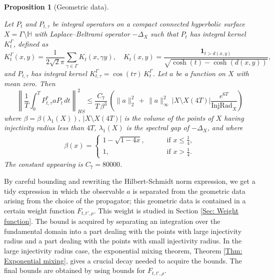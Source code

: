 \documentclass[11pt,twoside,reqno]{amsart} \usepackage{a4wide} \usepackage[T1]{fontenc} \usepackage[utf8]{inputenc} \usepackage{soul}  \usepackage{amsmath} \usepackage{amsfonts} \usepackage{amssymb} \usepackage{mathtools} \usepackage{amsthm} \usepackage{xcolor} \usepackage{graphicx} \usepackage{hyperref} \usepackage{standalone} \usepackage{esint} \usepackage{comment} \usepackage[left=2.3cm,top=3cm,right=2.3cm]{geometry} \usepackage{bm} \usepackage{svg} \usepackage{float} \numberwithin{equation}{section} \theoremstyle{plain} \newtheorem{thm}{Theorem}[section] \newtheorem{theorem}[thm]{Theorem} \newtheorem*{theorem*}{Theorem}\newtheorem{conj}[thm]{Conjecture} \newtheorem{lemma}[thm]{Lemma} \newtheorem{prop}[thm]{Proposition} \newtheorem{proposition}[thm]{Proposition} \newtheorem{cor}[thm]{Corollary} \newtheorem{question}[thm]{Question} \newtheorem{corollary}[thm]{Corollary} \newtheorem{assumption}[thm]{Assumption} \theoremstyle{definition} \newtheorem{defn}[thm]{Definition} \newtheorem{choice}[thm]{Choice} \newtheorem{definition}[thm]{Definition} \newtheorem{ex}[thm]{Example} \newtheorem{notation}[thm]{Notation} \newtheorem*{ack}{Acknowledgements} \theoremstyle{remark} \newtheorem{remark}[thm]{Remark} \newtheorem{bigremark}[thm]{Remark} \usepackage{xcolor} \newcommand{\red}[1]{ {\color{Red}#1} } \newcommand{\blue}[1]{ {\color{Blue}#1} } \author{Kai Hippi} \address{Aalto University, Espoo, Finland} \email{kai.hippi@aalto.fi}
\begin{document}
\begin{proposition}[Geometric data]
\label{Prp: Geometric data}

Let $P_t$ and $P_{t,\tau}$ be integral operators on a compact connected hyperbolic surface $X = \Gamma \setminus \mathbb{H}$ with Laplace--Beltrami operator $ -\Delta_{X} $ such that $ P_{t} $ has integral kernel $ K_{t}^{\Gamma} $, defined as
\[
K_t^\Gamma(x,y) = \frac{1}{2 \sqrt{2} \pi} \sum_{\gamma \in \Gamma} K_t(x, \gamma y), \quad
K_t(x,y) = \frac{\mathbf{1}_{t > d(x,y)}}{\sqrt{\cosh(t) - \cosh(d(x,y))}},
\]
and $ P_{t,\tau} $ has integral kernel $K_{t,\tau}^{\Gamma} = \cos(t \tau) \, K_t^\Gamma$. Let $ a $ be a function on $ X $ with mean zero. Then
\[
	\left\| \frac{1}{T} \int_0^T P_{t,\tau}^{*} a P_t \, dt \right\|_{HS}^{2} \leq \frac{C_{7}}{T \, \beta^{3}} \, \left( \| a \|_{2}^{2} \, + \,  \| a \|_{\infty}^{2} \, | X \setminus X( 4T ) | \frac{e^{6 T}}{ \operatorname{InjRad}_{X} } \right)
\]
where $ \beta = \beta( \lambda_{1}( X ) ) $,  $|X \setminus X( 4T )|$  is the volume of the points of $ X $ having injectivity radius less than $ 4T $, $ \lambda_{1}( X ) $ is the spectral gap of $ -\Delta_{X} $, and where
\begin{align*}
	\beta( x ) = 
	\begin{cases}	
		1 - \sqrt{ 1 - 4x }, \qquad & \text{ if } x \leq \frac{1}{4},
		\\
		1, \qquad & \text{ if } x > \frac{1}{4}.
	\end{cases}
\end{align*}
The constant appearing is $C_{7} = 80000$.

\end{proposition}

By careful bounding and rewriting the Hilbert-Schmidt norm expression, we get a tidy expression in which the observable $ a $ is separated from the geometric data arising from the choice of the propagator; this geometric data is contained in a certain weight function $ F_{t,t',\rho} $. This weight is studied in Section \ref{Sec: Weight function}. The bound is acquired by separating an integration over the fundamental domain into a part dealing with the points with large injectivity radius and a part dealing with the points with small injectivity radius. In the large injectivity radius case, the exponential mixing theorem, Theorem \ref{Thm: Exponential mixing}, gives a crucial decay needed to acquire the bounds. The final bounds are obtained by using bounds for $ F_{t,t',\rho} $. 
\end{document}
